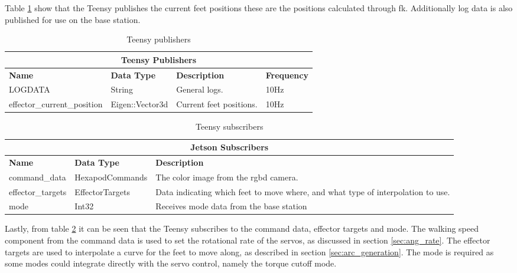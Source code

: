         Table \ref{tab:teensy_pubs} show that the Teensy publishes the current feet positions these are the positions calculated through \ac{fk}. Additionally
        log data is also published for use on the base station.
        \begin{table}[h]
            \begin{tabularx}{\textwidth}{| l | l | X | l |}
                \hline
                \multicolumn{4}{|c|}{\textbf{Teensy Publishers}} \\ \hline
                \textbf{Name} & \textbf{Data Type} & \textbf{Description} & \textbf{Frequency} \\ \hline
                LOGDATA & String & General logs. & 10Hz \\ \hline
                effector\_current\_position & Eigen::Vector3d & Current feet positions. & 10Hz \\ \hline
            \end{tabularx}
            \caption{Teensy publishers}
            \label{tab:teensy_pubs}
        \end{table}
        \begin{table}[h]
            \centering
            \begin{tabularx}{\textwidth}{| l | l | X |}
                \hline
                \multicolumn{3}{|c|}{\textbf{Jetson Subscribers}} \\ \hline
                \textbf{Name} & \textbf{Data Type} & \textbf{Description} \\ \hline
                command\_data & HexapodCommands & The color image from the \ac{rgbd} camera. \\ \hline
                effector\_targets & EffectorTargets & Data indicating which feet to move where, and what type of interpolation to use.\\ \hline
                mode & Int32 & Receives mode data from the base station \\ \hline
            \end{tabularx}
            \caption{Teensy subscribers}
            \label{tab:teensy_subs}
        \end{table}

        Lastly, from table \ref{tab:teensy_subs} it can be seen that the Teensy subscribes to the command data, effector targets and mode.
        The walking speed component from the command data is used to set the rotational rate of the servos, as discussed in section \ref{sec:ang_rate}.
        The effector targets are used to interpolate a curve for the feet to move along, as described in section \ref{sec:arc_generation}. The mode is required
        as some modes could integrate directly with the servo control, namely the torque cutoff mode.

